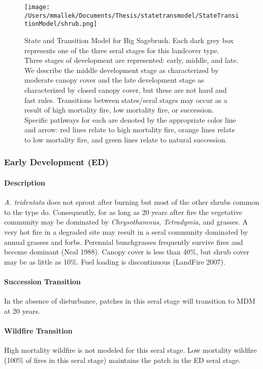 \begin{figure}[htbp]
\centering
\texttt{[image: /Users/mmallek/Documents/Thesis/statetransmodel/StateTransitionModel/shrub.png]}
\caption{State and Transition Model for Big Sagebrush. Each dark grey box represents one of the three seral stages for this landcover type. Three stages of development are represented: early, middle, and late. We describe the middle development stage as characterized by moderate canopy cover and the late development stage as characterized by closed canopy cover, but these are not hard and fast rules. Transitions between states/seral stages may occur as a result of high mortality fire, low mortality fire, or succession. Specific pathways for each are denoted by the appropriate color line and arrow: red lines relate to high mortality fire, orange lines relate to low mortality fire, and green lines relate to natural succession.} 
\label{sage_transmodel}
\end{figure}

\subsubsection{Early Development (ED)}

\paragraph{Description} \emph{A. tridentata} does not sprout after burning but most of the other shrubs common to the type do. Consequently, for as long as 20 years after fire the vegetative community may be dominated by \emph{Chrysothamnus}, \emph{Tetradymia}, and grasses. A very hot fire in a degraded site may result in a seral community dominated by annual grasses and forbs. Perennial bunchgrasses frequently survive fires and become dominant (Neal 1988). Canopy cover is less than 40\%, but shrub cover may be as little as 10\%. Fuel loading is discontinuous (LandFire 2007).

\paragraph{Succession Transition} In the absence of disturbance, patches in this seral stage will transition to MDM at 20 years. 

\paragraph{Wildfire Transition} High mortality wildfire is not modeled for this seral stage. Low mortality wildfire (100\% of fires in this seral stage) maintains the patch in the ED seral stage. 

